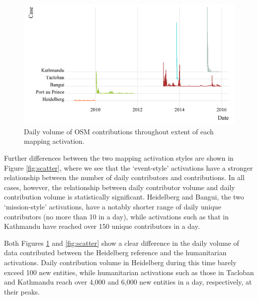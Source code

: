 \begin{figure} %
    \centering %
    \includegraphics[width = \textwidth]{Images/overtime.png} %
    \caption{Daily volume of OSM contributions throughout extent of each mapping activation. } %
    \label{fig:time} %
\end{figure}

Further differences between the two mapping activation styles are shown in Figure \ref{fig:scatter}, where we see that the ‘event-style’ activations have a stronger relationship between the number of daily contributors and contributions.  In all cases, however, the relationship between daily contributor volume and daily contribution volume is statistically significant. Heidelberg and Bangui, the two ‘mission-style’ activations, have a notably shorter range of daily unique contributors (no more than 10 in a day), while activations such as that in Kathmandu have reached over 150 unique contributors in a day. 

Both Figures \ref{fig:time} and \ref{fig:scatter} show a clear difference in the daily volume of data contributed between the Heidelberg reference and the humanitarian activations.  Daily contribution volume in Heidelberg during this time barely exceed 100 new entities, while humanitarian activations such as those in Tacloban and Kathmandu reach over 4,000 and 6,000 new entities in a day, respectively, at their peaks. 

